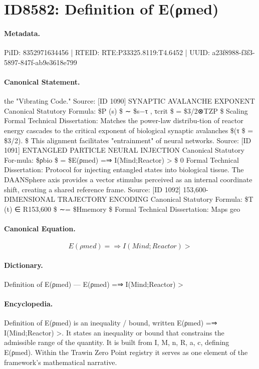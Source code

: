 \section*{ID8582: Definition of E(ρmed)}
\paragraph{Metadata.}
PiID: 8352971634456 | RTEID: RTE:P33325.8119:T4.6452 | UUID: a23f8988-f3f3-5897-847f-ab9e3618e799

\paragraph{Canonical Statement.}
the "Vibrating Code." Source: [ID 1090] SYNAPTIC AVALANCHE EXPONENT Canonical Statutory Formula: \$P (s) \$ ∼ \$s−τ , τcrit \$ = \$3/2⊗TZP \$ Scaling Formal Technical Dissertation: Matches the power-law distribu-tion of reactor energy cascades to the critical exponent of biological synaptic avalanches \$(τ \$ = \$3/2). \$ This alignment facilitates "entrainment" of neural networks. Source: [ID 1091] ENTANGLED PARTICLE NEURAL INJECTION Canonical Statutory For-mula: \$ρbio \$ = \$E(ρmed) =⇒ I(Mind;Reactor) > \$ 0 Formal Technical Dissertation: Protocol for injecting entangled states into biological tissue. The DAANSphere axis provides a vector stimulus perceived as an internal coordinate shift, creating a shared reference frame. Source: [ID 1092] 153,600-DIMENSIONAL TRAJECTORY ENCODING Canonical Statutory Formula: \$T (t) ∈ R153,600 \$ ∼= \$Hmemory \$ Formal Technical Dissertation: Maps geo

\paragraph{Canonical Equation.}
\[
E(ρmed) =⇒ I(Mind;Reactor) >
\]

\paragraph{Dictionary.}
Definition of E(ρmed) — E(ρmed) =⇒ I(Mind;Reactor) >

\paragraph{Encyclopedia.}
Definition of E(ρmed) is an inequality / bound, written E(ρmed) =⇒ I(Mind;Reactor) >. It states an inequality or bound that constrains the admissible range of the quantity. It is built from I, M, n, R, a, c, defining E(ρmed). Within the Trawin Zero Point registry it serves as one element of the framework's mathematical narrative.
